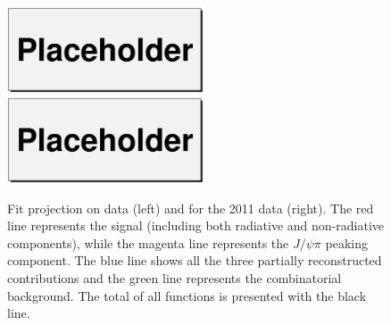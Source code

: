 \begin{figure}[!htb]
    \begin{center}
	\hspace{-0.5cm}
	\includegraphics[width=0.52\textwidth]{datafitN3.eps}
	\hspace{-0.5cm}
	\includegraphics[width=0.52\textwidth]{datafitN2011.eps}
	\caption{Fit projection on data (left) and for the 2011 data (right).
	    The red line represents the \BpmKpmJpsi{} signal (including both radiative
	    and non-radiative components), while the magenta line represents the
	    $J/\psi\pi$ peaking component. The blue line shows all the three partially
	    reconstructed contributions and the green line represents the
	    combinatorial background. The total of all functions is presented
	with the black line.}
	\label{fig:bplusfitN32011}
    \end{center}
\end{figure}

